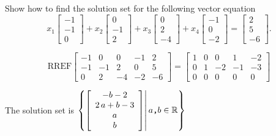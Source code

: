 
\begin{exerciseStatement}


Show how to find the solution set for the following vector equation \[ x_{1} \left[\begin{array}{c}
-1 \\
-1 \\
0
\end{array}\right] + x_{2} \left[\begin{array}{c}
0 \\
-1 \\
2
\end{array}\right] + x_{3} \left[\begin{array}{c}
0 \\
2 \\
-4
\end{array}\right] + x_{4} \left[\begin{array}{c}
-1 \\
0 \\
-2
\end{array}\right] = \left[\begin{array}{c}
2 \\
5 \\
-6
\end{array}\right] .\]


\end{exerciseStatement}
    
\begin{exerciseAnswer} 
\[\mathrm{RREF} \left[\begin{array}{cccc|c}
-1 & 0 & 0 & -1 & 2 \\
-1 & -1 & 2 & 0 & 5 \\
0 & 2 & -4 & -2 & -6
\end{array}\right]  =  \left[\begin{array}{cccc|c}
1 & 0 & 0 & 1 & -2 \\
0 & 1 & -2 & -1 & -3 \\
0 & 0 & 0 & 0 & 0
\end{array}\right] \]

The solution set is \( \left\{ \left[\begin{array}{c}
-b - 2 \\
2 \, a + b - 3 \\
a \\
b
\end{array}\right] \middle|\,a\text{\texttt{,}}b\in\mathbb{R}\right\} \)


\end{exerciseAnswer}
    
